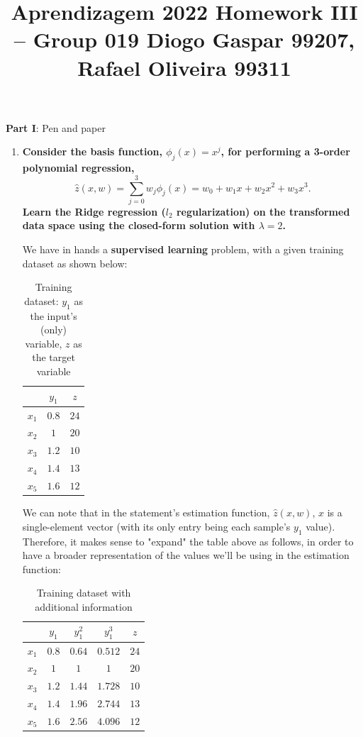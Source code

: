 \documentclass[12pt]{article}
\title{\large{Aprendizagem 2022}\vskip 0.2cm Homework III -- Group 019\vskip 0.2cm Diogo Gaspar 99207, Rafael Oliveira 99311}
\date{}
\begin{document}
\maketitle
\center\large{\vskip -2.5cm\textbf{Part I}: Pen and paper}
\begin{enumerate}[leftmargin=\labelsep]

  \item \textbf{Consider the basis function, $\phi_j(x) = x^j$, for performing a 3-order polynomial regression,
          $$
            \hat{z}(x, w) = \sum_{j=0}^3 w_j \phi_j(x) = w_0 + w_1 x + w_2 x^2 + w_3 x^3.
          $$
          Learn the Ridge regression ($l_2$ regularization) on the transformed data space
          using the closed-form solution with $\lambda = 2$.
        }

        We have in hands a \textbf{supervised learning} problem, with a given training
        dataset as shown below:

        \begin{table}[H]
          \centering
          \begin{tabular}{c|c|c}
                  & $y_1$ & $z$  \\ \hline
            $x_1$ & $0.8$ & $24$ \\
            $x_2$ & $1$   & $20$ \\
            $x_3$ & $1.2$ & $10$ \\
            $x_4$ & $1.4$ & $13$ \\
            $x_5$ & $1.6$ & $12$
          \end{tabular}
          \caption{Training dataset: $y_1$ as the input's (only) variable, $z$ as the target variable}
          \label{tab:training-dataset}
        \end{table}

        We can note that in the statement's estimation function, $\hat{z}(x, w)$, $x$ is a single-element vector
        (with its only entry being each sample's $y_1$ value). Therefore, it makes
        sense to "expand" the table above as follows, in order to have a broader
        representation of the values we'll be using in the estimation function:

        \begin{table}[h]
          \centering
          \begin{tabular}{c|ccc|c}
                  & $y_1$ & $y_1^2$ & $y_1^3$ & $z$  \\ \hline
            $x_1$ & $0.8$ & $0.64$  & $0.512$ & $24$ \\
            $x_2$ & $1$   & $1$     & $1$     & $20$ \\
            $x_3$ & $1.2$ & $1.44$  & $1.728$ & $10$ \\
            $x_4$ & $1.4$ & $1.96$  & $2.744$ & $13$ \\
            $x_5$ & $1.6$ & $2.56$  & $4.096$ & $12$
          \end{tabular}
          \caption{Training dataset with additional information}
          \label{tab:expanded-training-dataset}
        \end{table}


\end{enumerate}
\end{document}

